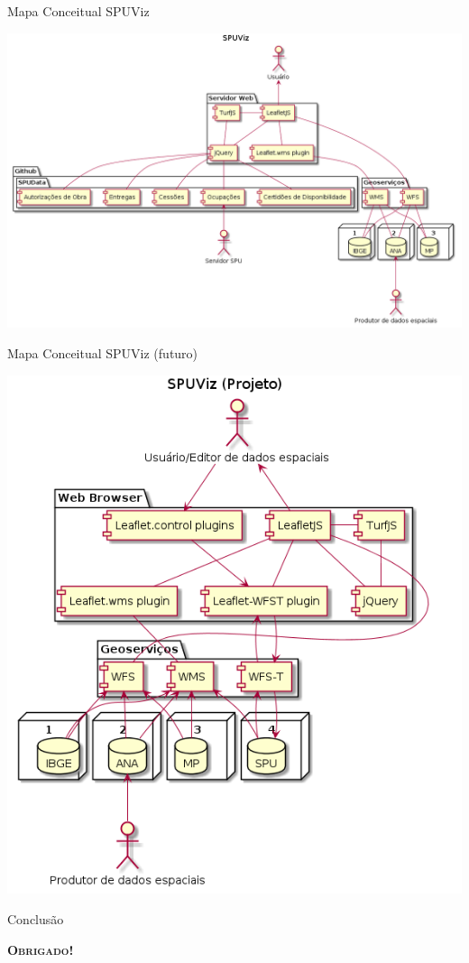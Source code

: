 \documentclass[9pt,ignorenonframetext,]{beamer}
\newif\ifbibliography
\begin{document}
\begin{frame}{Mapa Conceitual SPUViz}
\protect\hypertarget{mapa-conceitual-spuviz}{}

\begin{center}\includegraphics[width=0.7\linewidth]{modeloConceitual} \end{center}

\end{frame}

\begin{frame}{Mapa Conceitual SPUViz (futuro)}
\protect\hypertarget{mapa-conceitual-spuviz-futuro}{}

\begin{center}\includegraphics[width=0.7\linewidth]{modeloConceitual_Futuro} \end{center}

\end{frame}

\begin{frame}{Conclusão}
\protect\hypertarget{conclusuxe3o}{}

\Huge\center \textsc\textbf{Obrigado!}

\end{frame}


  \begin{frame}[allowframebreaks]{}
  \bibliographytrue
  \printbibliography[heading=none]
  \end{frame}
\end{document}
